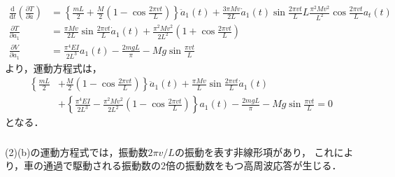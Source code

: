 \documentclass[a4paper]{jsarticle}
\begin{document}
\subsubsection{}
\begin{align}
  \frac{\mathrm{d}}{\mathrm{d} t}
  \left(\frac{\partial T}{\partial \dot{a}}\right)
   & = \left\{\frac{m L}{2} + \frac{M}{2}
  \left(1 - \cos \frac{2 \pi v t}{L}\right)\right\} \ddot{a}_1(t)
  + \frac{3 \pi M v}{2 L} \dot{a}_1(t) \sin \frac{2 \pi v t}{L}
  L \frac{\pi^2 M v^2}{L^2} \cos \frac{2 \pi v t}{L} a_t(t)             \\
  \frac{\partial T}{\partial a_1}
   & = \frac{\pi M v}{2 L} \sin \frac{2 \pi v t}{L} \dot{a}_1(t)
  + \frac{\pi^2 M v^2}{2 L^2} \left(1 + \cos \frac{2 \pi v t}{L}\right) \\
  \frac{\partial V}{\partial a_1}
   & = \frac{\pi^4 E I}{2 L^3} a_1(t)
  - \frac{2 m g L}{\pi} - M g \sin \frac{\pi v t}{L}
\end{align}
より，運動方程式は，
\begin{equation}
  \begin{aligned}
    \left\{\frac{m L}{2} \right. & + \left.\frac{M}{2}
    \left(1 - \cos \frac{2 \pi v t}{L}\right)\right\} \ddot{a}_1(t)
    + \frac{\pi M v}{L} \sin \frac{2 \pi v t}{L} \dot{a}_1(t)                                   \\
                                 & + \left\{\frac{\pi^4 E I}{2 L^3} - \frac{\pi^2 M v^2}{2 L^2}
    \left(1 - \cos \frac{2 \pi v t}{L}\right)\right\} a_1(t)
    - \frac{2 m g L}{\pi} - M g \sin \frac{\pi v t}{L} = 0
  \end{aligned}
\end{equation}
となる．

\subsubsection{}
(2)(b)の運動方程式では，振動数$2 \pi v/L$の振動を表す非線形項があり，
これにより，車の通過で駆動される振動数の2倍の振動数をもつ高周波応答が生じる．
\end{document}
